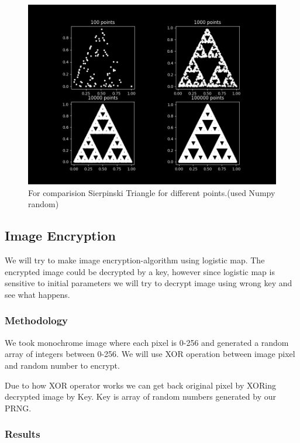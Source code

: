 \documentclass{report}
\begin{document}
\begin{figure}[!h]
    \centering
    \includegraphics[scale=.4]{images/numpytri.png}
    \caption{For comparision Sierpinski Triangle for different points.(used Numpy random)}
    \label{fig:my_label12}
\end{figure}
\newpage
\subsection{Image Encryption}

We will try to make image encryption-algorithm using logistic map. The encrypted image could be decrypted by a key, however since logistic map is sensitive to initial parameters we will try to decrypt image using wrong key and see what happens.

\subsubsection{Methodology}

We took monochrome image where each pixel is 0-256 and generated a random array of integers between 0-256. We will use XOR operation between image pixel and random number to encrypt.

Due to how XOR operator works we can get back original pixel by XORing decrypted image by Key. Key is array of random numbers generated by our PRNG.

\subsubsection{Results}
\end{document}
